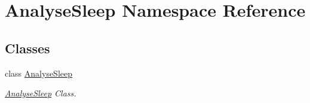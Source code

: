 \hypertarget{namespace_analyse_sleep}{}\section{Analyse\+Sleep Namespace Reference}
\label{namespace_analyse_sleep}
\subsection*{Classes}
\begin{DoxyCompactItemize}
\item 
class \mbox{\hyperlink{class_analyse_sleep_1_1_analyse_sleep}{Analyse\+Sleep}}
\begin{DoxyCompactList}\small\item\em \mbox{\hyperlink{class_analyse_sleep_1_1_analyse_sleep}{Analyse\+Sleep}} Class. \end{DoxyCompactList}\end{DoxyCompactItemize}
